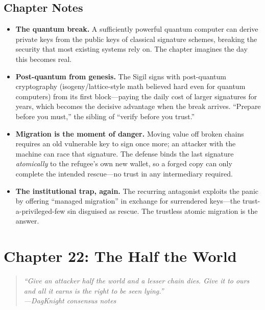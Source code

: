 \documentclass[12pt,letterpaper]{book}
\providecommand{\tightlist}{\setlength{\itemsep}{0pt}\setlength{\parskip}{0pt}}
\begin{document}
\hypertarget{chapter-21-notes}{%
\subsection{Chapter Notes}\label{chapter-21-notes}}

\begin{itemize}
\tightlist
\item
  \textbf{The quantum break.} A sufficiently powerful quantum computer can derive
  private keys from the public keys of classical signature schemes, breaking the
  security that most existing systems rely on. The chapter imagines the day this
  becomes real.
\item
  \textbf{Post-quantum from genesis.} The Sigil signs with post-quantum
  cryptography (isogeny/lattice-style math believed hard even for quantum
  computers) from its first block---paying the daily cost of larger signatures for
  years, which becomes the decisive advantage when the break arrives. ``Prepare
  before you must,'' the sibling of ``verify before you trust.''
\item
  \textbf{Migration is the moment of danger.} Moving value off broken chains
  requires an old vulnerable key to sign once more; an attacker with the machine
  can race that signature. The defense binds the last signature \emph{atomically}
  to the refugee's own new wallet, so a forged copy can only complete the intended
  rescue---no trust in any intermediary required.
\item
  \textbf{The institutional trap, again.} The recurring antagonist exploits the
  panic by offering ``managed migration'' in exchange for surrendered keys---the
  trust-a-privileged-few sin disguised as rescue. The trustless atomic migration is
  the answer.
\end{itemize}


\hypertarget{chapter-22-the-half-the-world}{%
\section{Chapter 22: The Half the
World}\label{chapter-22-the-half-the-world}}

\begin{quote}
\itshape ``Give an attacker half the world and a lesser chain dies. Give it to
ours and all it earns is the right to be seen lying.''\\
\normalfont\hfill---DagKnight consensus notes
\end{quote}
\end{document}

